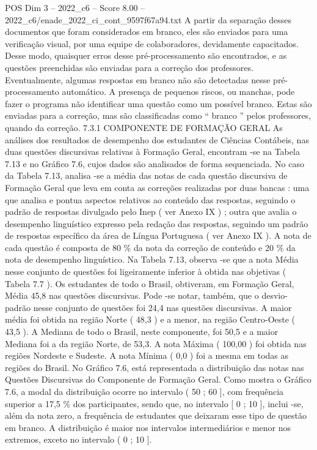 \begin{textsample}{POS Dim 3 – 2022\_c6 – Score 8.00 – 2022\_c6/enade\_2022\_ci\_cont\_9597f67a94.txt}
A partir da separação desses documentos que foram considerados em branco, eles são enviados para uma verificação visual, por uma equipe de colaboradores, devidamente capacitados.
Desse modo, quaisquer erros desse pré-processamento são encontrados, e as questões preenchidas são enviadas para a correção dos professores.
Eventualmente, algumas respostas em branco não são detectadas nesse pré-processamento automático.
A presença de pequenos riscos, ou manchas, pode fazer o programa não identificar uma questão como um possível branco.
Estas são enviadas para a correção, mas são classificadas como “ branco ” pelos professores, quando da correção. 7.3.1 COMPONENTE DE FORMAÇÃO GERAL As análises dos resultados de desempenho dos estudantes de Ciências Contábeis, nas duas questões discursivas relativas à Formação Geral, encontram -se na Tabela 7.13 e no Gráfico 7.6, cujos dados são analisados de forma sequenciada.
No caso da Tabela 7.13, analisa -se a média das notas de cada questão discursiva de Formação Geral que leva em conta as correções realizadas por duas bancas : uma que analisa e pontua aspectos relativos ao conteúdo das respostas, seguindo o padrão de respostas divulgado pelo Inep ( ver Anexo IX ) ; outra que avalia o desempenho linguístico expresso pela redação das respostas, seguindo um padrão de respostas específico da área de Língua Portuguesa ( ver Anexo IX ).
A nota de cada questão é composta de 80 \% da nota da correção de conteúdo e 20 \% da nota de desempenho linguístico.
Na Tabela 7.13, observa -se que a nota Média nesse conjunto de questões foi ligeiramente inferior à obtida nas objetivas ( Tabela 7.7 ).
Os estudantes de todo o Brasil, obtiveram, em Formação Geral, Média 45,8 nas questões discursivas.
Pode -se notar, também, que o desvio-padrão nesse conjunto de questões foi 24,4 nas questões discursivas.
A maior média foi obtida na região Norte ( 48,3 ) e a menor, na região Centro-Oeste ( 43,5 ).
A Mediana de todo o Brasil, neste componente, foi 50,5 e a maior Mediana foi a da região Norte, de 53,3.
A nota Máxima ( 100,00 ) foi obtida nas regiões Nordeste e Sudeste.
A nota Mínima ( 0,0 ) foi a mesma em todas as regiões do Brasil.
No Gráfico 7.6, está representada a distribuição das notas nas Questões Discursivas do Componente de Formação Geral.
Como mostra o Gráfico 7.6, a modal da distribuição ocorre no intervalo ( 50 ; 60 ], com frequência superior a 17,5 \% dos participantes, sendo que, no intervalo [ 0 ; 10 ], inclui -se, além da nota zero, a frequência de estudantes que deixaram esse tipo de questão em branco.
A distribuição é maior nos intervalos intermediários e menor nos extremos, exceto no intervalo ( 0 ; 10 ].

\end{textsample}
